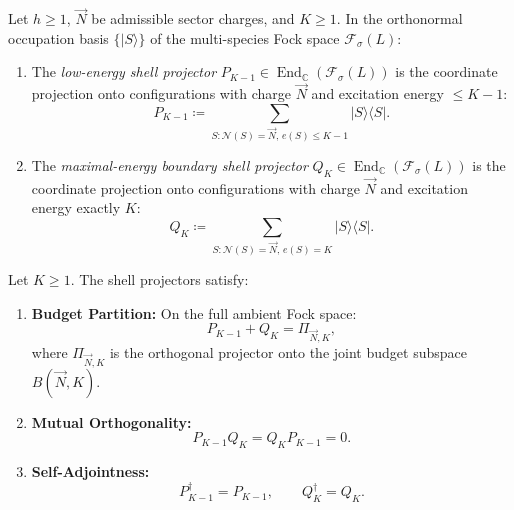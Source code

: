 \begin{definition}
Let $h \ge 1$, $\vec{N}$ be admissible sector charges, and $K \ge 1$.
In the orthonormal occupation basis $\{|S\rangle\}$ of the multi-species Fock space $\mathcal{F}_\sigma(L)$:
\begin{enumerate}
    \item The \emph{low-energy shell projector} $P_{K-1} \in \operatorname{End}_{\mathbb{C}}(\mathcal{F}_\sigma(L))$ is the coordinate projection onto configurations with charge $\vec{N}$ and excitation energy $\le K - 1$:
    \begin{equation}
    P_{K-1} \coloneqq \sum_{S : \mathcal{N}(S) = \vec{N}, \, e(S) \le K-1} |S\rangle\langle S|.
    \end{equation}
    \item The \emph{maximal-energy boundary shell projector} $Q_K \in \operatorname{End}_{\mathbb{C}}(\mathcal{F}_\sigma(L))$ is the coordinate projection onto configurations with charge $\vec{N}$ and excitation energy exactly $K$:
    \begin{equation}
    Q_K \coloneqq \sum_{S : \mathcal{N}(S) = \vec{N}, \, e(S) = K} |S\rangle\langle S|.
    \end{equation}
\end{enumerate}
\end{definition}

\begin{theorem}
\label{thm:app_shell_projectors}
Let $K \ge 1$. The shell projectors satisfy:
\begin{enumerate}
    \item \textbf{Budget Partition:} On the full ambient Fock space:
    \begin{equation}
    P_{K-1} + Q_K = \Pi_{\vec{N}, K},
    \end{equation}
    where $\Pi_{\vec{N}, K}$ is the orthogonal projector onto the joint budget subspace $B(\vec{N}, K)$.
    \item \textbf{Mutual Orthogonality:}
    \begin{equation}
    P_{K-1} Q_K = Q_K P_{K-1} = 0.
    \end{equation}
    \item \textbf{Self-Adjointness:}
    \begin{equation}
    P_{K-1}^\dagger = P_{K-1}, \qquad Q_K^\dagger = Q_K.
    \end{equation}
\end{enumerate}
\end{theorem}

